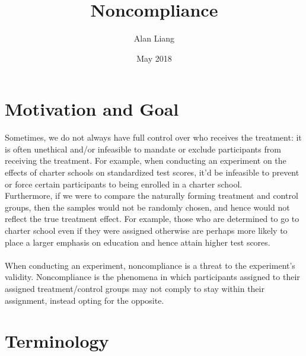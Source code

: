 \documentclass{article}
\title{Noncompliance}
\author{Alan Liang}
\date{May 2018}
\begin{document}
\maketitle

\section{Motivation and Goal}

Sometimes, we do not always have full control over who receives the treatment: it is often unethical and/or infeasible to mandate or exclude participants from receiving the treatment.
For example, when conducting an experiment on the effects of charter schools on standardized test scores, it'd be infeasible to prevent or force certain participants to being enrolled in a charter school. 
\\
Furthermore, if we were to compare the naturally forming treatment and control groups, then the samples would not be randomly chosen, and hence would not reflect the true treatment effect. 
For example, those who are determined to go to charter school even if they were assigned otherwise are perhaps more likely to place a larger emphasis on education and hence attain higher test scores.
\\
\\
When conducting an experiment, noncompliance is a threat to the experiment's validity.
Noncompliance is the phenomena in which participants assigned to their assigned treatment/control groups may not comply to stay within their assignment, instead opting for the opposite. 

\section{Terminology} 
\end{document}
